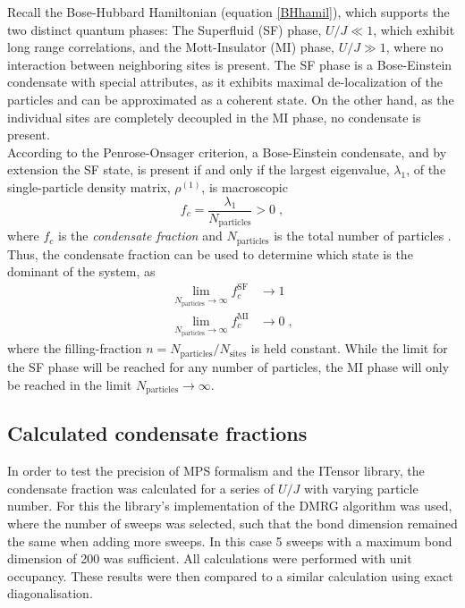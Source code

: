 Recall the Bose-Hubbard Hamiltonian (equation \eqref{BHhamil}), which supports the two distinct quantum phases: The Superfluid (SF) phase, $U/J \ll 1$, which exhibit long range correlations, and the Mott-Insulator (MI) phase, $U/J \gg 1$, where no interaction between neighboring sites is present. The SF phase is a Bose-Einstein condensate with special attributes, as it exhibits maximal de-localization of the particles and can be approximated as a coherent state. On the other hand, as the individual sites are completely decoupled in the MI phase, no condensate is present. \\
According to the Penrose-Onsager criterion, a Bose-Einstein condensate, and by extension the SF state, is present if and only if the largest eigenvalue, $\lambda_1$, of the single-particle density matrix, $\rho^{(1)}$, is macroscopic
\begin{equation}
	f_c = \frac{\lambda_1}{N_{\mathrm{particles}}} > 0 \; ,
\end{equation} 
where $f_c$ is the \textit{condensate fraction} and $N_{\mathrm{particles}}$ is the total number of particles \cite{PenroseOnsager}. Thus, the condensate fraction can be used to determine which state is the dominant of the system, as
\begin{align}
	\lim_{N_{\mathrm{particles}} \to \infty} f_{c}^{\mathrm{SF}} &\to 1 \label{eq:SF_lim} \\
	\lim_{N_{\mathrm{particles}} \to \infty} f_{c}^{\mathrm{MI}} &\to 0 \; , \label{eq:MI_lim}
\end{align}
where the filling-fraction $n = N_{\mathrm{particles}}/N_{\mathrm{sites}}$ is held constant. While the limit for the SF phase will be reached for any number of particles, the MI phase will only be reached in the limit $N_{\mathrm{particles}} \to \infty$.

\subsection{Calculated condensate fractions}
In order to test the precision of MPS formalism and the ITensor library, the condensate fraction was calculated for a series of $U/J$ with varying particle number. For this the library's implementation of the DMRG algorithm was used, where the number of sweeps was selected, such that the bond dimension remained the same when adding more sweeps. In this case 5 sweeps with a maximum bond dimension of 200 was sufficient. All calculations were performed with unit occupancy. These results were then compared to a similar calculation using exact diagonalisation.

